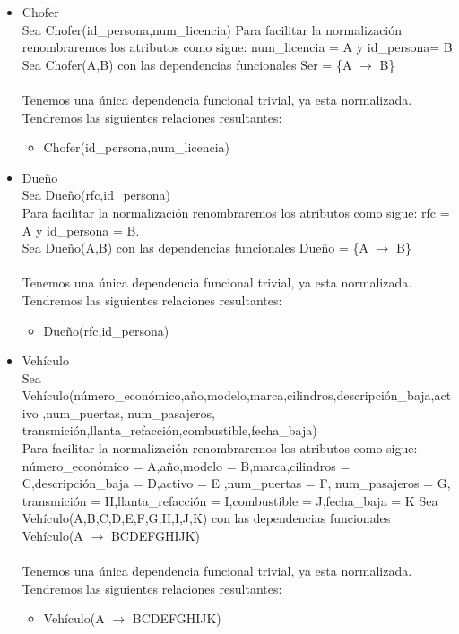 \documentclass{article}
\begin{document}
\begin{itemize}
\item Chofer\\
Sea Chofer(id\_persona,num\_licencia)
Para facilitar la normalización renombraremos los atributos como sigue:
 num\_licencia = A y id\_persona= B 
Sea Chofer(A,B) con las dependencias funcionales 
Ser = \{A $\rightarrow$ B\} \\
\\
Tenemos una única dependencia funcional trivial, ya esta normalizada.
Tendremos las siguientes relaciones resultantes:
\begin{itemize}
\item Chofer(id\_persona,num\_licencia)
\end{itemize}


\item Dueño\\
Sea Dueño(rfc,id\_persona)\\
Para facilitar la normalización renombraremos los atributos como sigue:
rfc = A y id\_persona = B.\\
Sea Dueño(A,B) con las dependencias funcionales 
Dueño = \{A $\rightarrow$ B\} \\
\\
Tenemos una única dependencia funcional trivial, ya esta normalizada.
Tendremos las siguientes relaciones resultantes:
\begin{itemize}
\item Dueño(rfc,id\_persona)
\end{itemize}


\item Vehículo\\
Sea Vehículo(número\_económico,año,modelo,marca,cilindros,descripción\_baja,activo
,num\_puertas, num\_pasajeros, transmición,llanta\_refacción,combustible,fecha\_baja)\\
Para facilitar la normalización renombraremos los atributos como sigue:
número\_económico = A,año,modelo = B,marca,cilindros = C,descripción\_baja = D,activo = E
,num\_puertas = F, num\_pasajeros = G, transmición = H,llanta\_refacción = I,combustible = J,fecha\_baja = K
Sea Vehículo(A,B,C,D,E,F,G,H,I,J,K) con las dependencias funcionales
Vehículo(A $\rightarrow$ BCDEFGHIJK) \\
\\
Tenemos una única dependencia funcional trivial, ya esta normalizada.
Tendremos las siguientes relaciones resultantes:
\begin{itemize}
\item Vehículo(A $\rightarrow$ BCDEFGHIJK) \\
\end{itemize}




\end{itemize}
\end{document}
